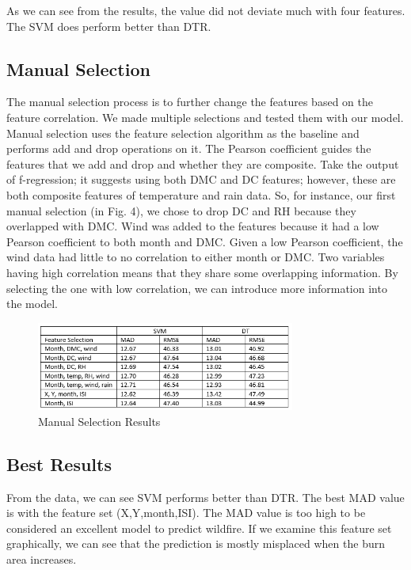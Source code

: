 \documentclass[conference]{IEEEtran}
\begin{document}
As we can see from the results, the value did not deviate much with four features. The SVM does perform better than DTR.

\subsection{Manual Selection}
The manual selection process is to further change the features based on the feature correlation. We made multiple selections and tested them with our model. Manual selection uses the feature selection algorithm as the baseline and performs add and drop operations on it. The Pearson coefficient guides the features that we add and drop and whether they are composite. Take the output of f-regression; it suggests using both DMC and DC features; however, these are both composite features of temperature and rain data. So, for instance, our first manual selection (in Fig. 4), we chose to drop DC and RH because they overlapped with DMC. Wind was added to the features because it had a low Pearson coefficient to both month and DMC. Given a low Pearson coefficient, the wind data had little to no correlation to either month or DMC. Two variables having high correlation means that they share some overlapping information. By selecting the one with low correlation, we can introduce more information into the model. 

\begin{center}
    \begin{figure}[H]
        \centering
        \includegraphics[width=8.5cm]{manual_selection.PNG}
        \caption{Manual Selection Results}
        \label{fig:manual_selection_results}
    \end{figure}
\end{center}

\subsection{Best Results}
From the data, we can see SVM performs better than DTR. The best MAD value is with the feature set (X,Y,month,ISI). The MAD value is too high to be considered an excellent model to predict wildfire. If we examine this feature set graphically, we can see that the prediction is mostly misplaced when the burn area increases.
\end{document}

